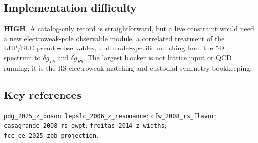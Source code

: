 \subsection*{Implementation difficulty}
\textbf{HIGH}.  A catalog-only record is straightforward, but a live constraint would
need a new electroweak-pole observable module, a correlated treatment of the
LEP/SLC pseudo-observables, and model-specific matching from the 5D spectrum to
\(\delta g_{Lb}\) and \(\delta g_{Rb}\).  The largest blocker is not lattice
input or QCD running; it is the RS electroweak matching and custodial-symmetry
bookkeeping.

\subsection*{Key references}
\texttt{pdg\_2025\_z\_boson}; \texttt{lepslc\_2006\_z\_resonance};
\texttt{cfw\_2008\_rs\_flavor}; \texttt{casagrande\_2008\_rs\_ewpt};
\texttt{freitas\_2014\_z\_widths}; \texttt{fcc\_ee\_2025\_zbb\_projection}.
